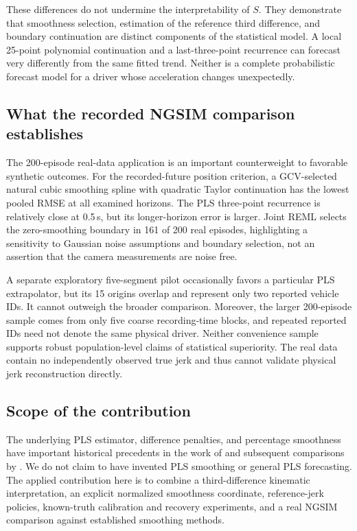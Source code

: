 These differences do not undermine
the interpretability of $S$.
They demonstrate that smoothness
selection, estimation of the
reference third difference,
and boundary continuation are
distinct components of the
statistical model. A local
25-point polynomial continuation
and a last-three-point recurrence
can forecast very differently
from the same fitted trend.
Neither is a complete probabilistic
forecast model for a driver whose
acceleration changes unexpectedly.

\subsection{What the recorded NGSIM comparison establishes}
The 200-episode real-data application
is an important counterweight
to favorable synthetic outcomes.
For the recorded-future position
criterion, a GCV-selected natural
cubic smoothing spline with
quadratic Taylor continuation
has the lowest pooled RMSE
at all examined horizons.
The PLS three-point recurrence
is relatively close at 0.5\,s,
but its longer-horizon error
is larger. Joint REML selects the
zero-smoothing boundary in 161
of 200 real episodes, highlighting
a sensitivity to Gaussian noise
assumptions and boundary selection,
not an assertion that the camera
measurements are noise free.

A separate exploratory five-segment
pilot occasionally favors a
particular PLS extrapolator, but
its 15 origins overlap and
represent only two reported
vehicle IDs. It cannot outweigh
the broader comparison.
Moreover, the larger 200-episode
sample comes from only five
coarse recording-time blocks,
and repeated reported IDs need
not denote the same physical
driver. Neither convenience
sample supports robust
population-level claims of
statistical superiority. The
real data contain no independently
observed true jerk and thus
cannot validate physical
jerk reconstruction directly.

\subsection{Scope of the contribution}
The underlying PLS estimator,
difference penalties, and
percentage smoothness have
important historical precedents
in the work of
\citet{guerrero2007,guerrero2008}
and subsequent comparisons by
\citet{cortes2017}. We do not
claim to have invented PLS
smoothing or general PLS
forecasting. The applied
contribution here is to
combine a third-difference
kinematic interpretation,
an explicit normalized
smoothness coordinate,
reference-jerk policies,
known-truth calibration
and recovery experiments,
and a real NGSIM comparison
against established
smoothing methods.

